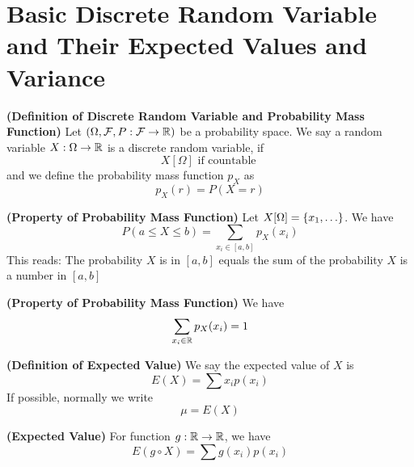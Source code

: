 \documentclass{report}
\begin{document}
\section{Basic Discrete Random Variable and Their Expected Values and Variance}
\begin{definition}
\label{1.1.1}
\textbf{(Definition of Discrete Random Variable and Probability Mass Function)} Let $(\Omega,\mathcal{F},P:\mathcal{F}\rightarrow \mathbb{R})$ be a probability space. We say a random variable $X:\Omega\rightarrow \mathbb{R} $ is a discrete random variable, if 
\begin{equation}
  X[\Omega]\text{ if countable }
\end{equation}
and we define the probability mass function $p_X$ as
\begin{equation}
p_X(r)=P(X=r)
\end{equation}
\end{definition}
\begin{theorem}
\label{1.1.2}
\textbf{(Property of Probability Mass Function)} Let $X[\Omega]=\set{x_1, \dots }$. We have
\begin{equation}
P(a\leq X\leq b)=\sum_{x_i\in [a,b]}p_X(x_i)
\end{equation}
This reads: The probability $X$ is in  $[a,b]$ equals the sum of the probability $X$ is a number in  $[a,b]$
\end{theorem}
\begin{theorem}
\label{1.1.3}
\textbf{(Property of Probability Mass Function)} We have
\begin{equation}
\sum_{x_i \in \mathbb{R}} p_X(x_i)=1
\end{equation}
\end{theorem}
\begin{definition}
\label{1.1.4}
\textbf{(Definition of Expected Value)} We say the expected value of $X$ is 
 \begin{equation}
E(X)=\sum x_ip(x_i)
\end{equation}
If possible, normally we write
\begin{equation}
\mu = E(X)
\end{equation}
\end{definition}
\begin{theorem}
\label{1.1.5}
\textbf{(Expected Value)} For function $g:\mathbb{R}\rightarrow \mathbb{R}$, we have
\begin{equation}
E(g\circ X)=\sum g(x_i)p(x_i)
\end{equation}
\end{theorem}
\end{document}
